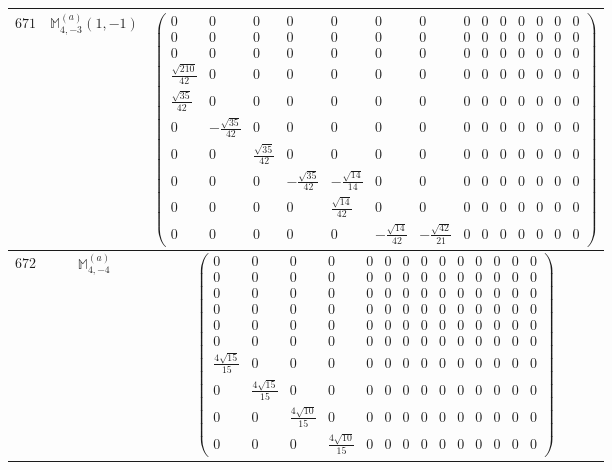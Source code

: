 \documentclass[fleqn,8pt,landscape]{jsarticle}
\begin{document}
\begin{center}
\begin{longtable}{ccc}
$ 671 $ & $ \mathbb{M}_{4,-3}^{(a)}(1,-1) $ & $ \begin{pmatrix} 0 & 0 & 0 & 0 & 0 & 0 & 0 & 0 & 0 & 0 & 0 & 0 & 0 & 0 \\ 0 & 0 & 0 & 0 & 0 & 0 & 0 & 0 & 0 & 0 & 0 & 0 & 0 & 0 \\ 0 & 0 & 0 & 0 & 0 & 0 & 0 & 0 & 0 & 0 & 0 & 0 & 0 & 0 \\ \frac{\sqrt{210}}{42} & 0 & 0 & 0 & 0 & 0 & 0 & 0 & 0 & 0 & 0 & 0 & 0 & 0 \\ \frac{\sqrt{35}}{42} & 0 & 0 & 0 & 0 & 0 & 0 & 0 & 0 & 0 & 0 & 0 & 0 & 0 \\ 0 & - \frac{\sqrt{35}}{42} & 0 & 0 & 0 & 0 & 0 & 0 & 0 & 0 & 0 & 0 & 0 & 0 \\ 0 & 0 & \frac{\sqrt{35}}{42} & 0 & 0 & 0 & 0 & 0 & 0 & 0 & 0 & 0 & 0 & 0 \\ 0 & 0 & 0 & - \frac{\sqrt{35}}{42} & - \frac{\sqrt{14}}{14} & 0 & 0 & 0 & 0 & 0 & 0 & 0 & 0 & 0 \\ 0 & 0 & 0 & 0 & \frac{\sqrt{14}}{42} & 0 & 0 & 0 & 0 & 0 & 0 & 0 & 0 & 0 \\ 0 & 0 & 0 & 0 & 0 & - \frac{\sqrt{14}}{42} & - \frac{\sqrt{42}}{21} & 0 & 0 & 0 & 0 & 0 & 0 & 0 \end{pmatrix} $ \\ \hline
$ 672 $ & $ \mathbb{M}_{4,-4}^{(a)} $ & $ \begin{pmatrix} 0 & 0 & 0 & 0 & 0 & 0 & 0 & 0 & 0 & 0 & 0 & 0 & 0 & 0 \\ 0 & 0 & 0 & 0 & 0 & 0 & 0 & 0 & 0 & 0 & 0 & 0 & 0 & 0 \\ 0 & 0 & 0 & 0 & 0 & 0 & 0 & 0 & 0 & 0 & 0 & 0 & 0 & 0 \\ 0 & 0 & 0 & 0 & 0 & 0 & 0 & 0 & 0 & 0 & 0 & 0 & 0 & 0 \\ 0 & 0 & 0 & 0 & 0 & 0 & 0 & 0 & 0 & 0 & 0 & 0 & 0 & 0 \\ 0 & 0 & 0 & 0 & 0 & 0 & 0 & 0 & 0 & 0 & 0 & 0 & 0 & 0 \\ \frac{4 \sqrt{15}}{15} & 0 & 0 & 0 & 0 & 0 & 0 & 0 & 0 & 0 & 0 & 0 & 0 & 0 \\ 0 & \frac{4 \sqrt{15}}{15} & 0 & 0 & 0 & 0 & 0 & 0 & 0 & 0 & 0 & 0 & 0 & 0 \\ 0 & 0 & \frac{4 \sqrt{10}}{15} & 0 & 0 & 0 & 0 & 0 & 0 & 0 & 0 & 0 & 0 & 0 \\ 0 & 0 & 0 & \frac{4 \sqrt{10}}{15} & 0 & 0 & 0 & 0 & 0 & 0 & 0 & 0 & 0 & 0 \end{pmatrix} $ \\ \hline

\end{longtable}
\end{center}
\end{document}
